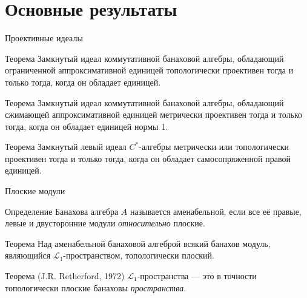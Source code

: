 \documentclass[9pt,pdf,utf8,russian]{beamer}
\begin{document}
\section{Основные результаты}

\begin{frame}{Проективные идеалы}
  \begin{alertblock}{Теорема} 
    Замкнутый идеал коммутативной банаховой алгебры, обладающий ограниченной аппроксимативной 
    единицей топологически проективен тогда и только тогда, когда он обладает единицей.
  \end{alertblock}
  \pause
  \begin{alertblock}{Теорема} 
    Замкнутый идеал коммутативной банаховой алгебры, обладающий \alert{сжимающей} аппроксимативной 
    единицей \alert{метрически} проективен тогда и только тогда, когда он обладает единицей \alert{нормы 1}.
  \end{alertblock}
  \pause
  \begin{alertblock}{Теорема} 
  	Замкнутый левый идеал \alert{$C^*$-алгебры} метрически или топологически проективен тогда и только тогда, когда он обладает самосопряженной правой единицей.
  \end{alertblock}
\end{frame}

\begin{frame}{Плоские модули}
  \pause
  \begin{block}{Определение}
 	 Банахова алгебра $A$ называется аменабельной, если все её правые, левые и двусторонние	 модули \textit{относительно} плоские.
  \end{block}
  \pause
  \begin{alertblock}{Теорема}
  	Над аменабельной банаховой алгеброй всякий банахов модуль, являющийся $\mathscr{L}_1$-пространством, топологически плоский.
  \end{alertblock}
  \pause
  \begin{block}{Теорема (J.R. Retherford, 1972)} 
  	$\mathscr{L}_1$-пространства --- это в точности топологически плоские банаховы \textit{пространства}.
  \end{block}
\end{frame}
\end{document}
